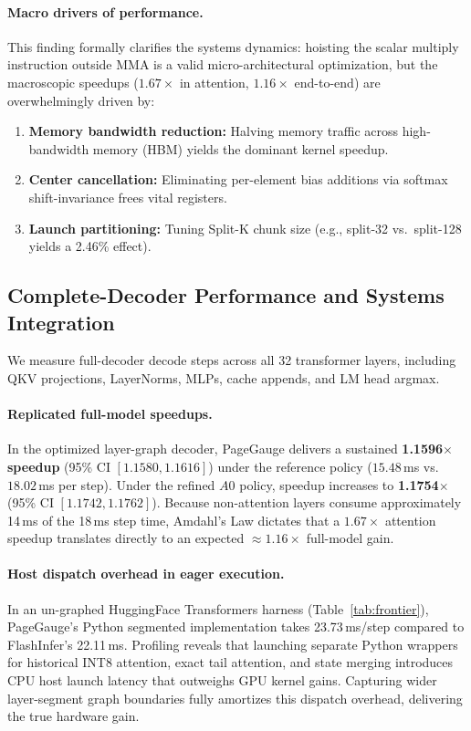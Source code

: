 \documentclass{article}
\begin{document}
\paragraph{Macro drivers of performance.}
This finding formally clarifies the systems dynamics: hoisting the scalar multiply instruction outside MMA is a valid micro-architectural optimization, but the macroscopic speedups ($1.67\times$ in attention, $1.16\times$ end-to-end) are overwhelmingly driven by:
\begin{enumerate}
    \item \textbf{Memory bandwidth reduction:} Halving memory traffic across high-bandwidth memory (HBM) yields the dominant kernel speedup.
    \item \textbf{Center cancellation:} Eliminating per-element bias additions via softmax shift-invariance frees vital registers.
    \item \textbf{Launch partitioning:} Tuning Split-K chunk size (e.g., split-32 vs.\ split-128 yields a 2.46\% effect).
\end{enumerate}

\subsection{Complete-Decoder Performance and Systems Integration}
We measure full-decoder decode steps across all 32 transformer layers, including QKV projections, LayerNorms, MLPs, cache appends, and LM head argmax.

\paragraph{Replicated full-model speedups.}
In the optimized layer-graph decoder, PageGauge delivers a sustained \textbf{1.1596$\times$ speedup} (95\% CI $[1.1580, 1.1616]$) under the reference policy ($15.48$\,ms vs.\ $18.02$\,ms per step). Under the refined $A0$ policy, speedup increases to \textbf{1.1754$\times$} (95\% CI $[1.1742, 1.1762]$). Because non-attention layers consume approximately 14\,ms of the 18\,ms step time, Amdahl's Law dictates that a $1.67\times$ attention speedup translates directly to an expected $\approx 1.16\times$ full-model gain.

\paragraph{Host dispatch overhead in eager execution.}
In an un-graphed HuggingFace Transformers harness (Table~\ref{tab:frontier}), PageGauge's Python segmented implementation takes 23.73\,ms/step compared to FlashInfer's 22.11\,ms. Profiling reveals that launching separate Python wrappers for historical INT8 attention, exact tail attention, and state merging introduces CPU host launch latency that outweighs GPU kernel gains. Capturing wider layer-segment graph boundaries fully amortizes this dispatch overhead, delivering the true hardware gain.
\end{document}
